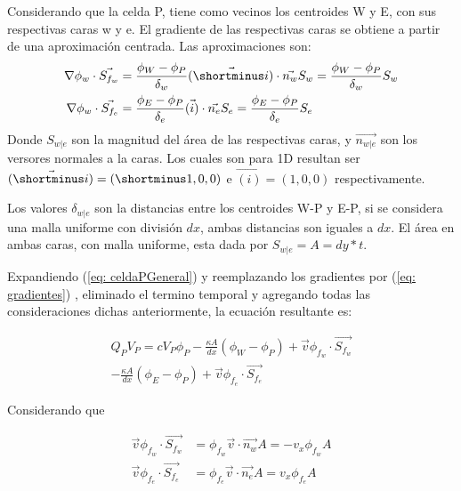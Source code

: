\documentclass{article}
\begin{document}
    Considerando que la celda P, tiene como vecinos los centroides W y E, con sus respectivas caras w y e.
    El gradiente de las respectivas caras se obtiene a partir de una aproximación centrada. Las aproximaciones son:
    \begin{equation}
        \begin{aligned}
            \nabla \phi_w \cdot \vec{S_{f_w}} &=
            \frac{\phi_W - \phi_P}{\delta_w} \vec{(\shortminus i)} \cdot \vec{n_w} S_w =
            \frac{\phi_W - \phi_P}{\delta_w} S_w \\
            \nabla \phi_w \cdot \vec{S_{f_e}} &=
            \frac{\phi_E - \phi_P}{\delta_e} \vec{(i)} \cdot \vec{n_e} S_e =
            \frac{\phi_E - \phi_P}{\delta_e} S_e
        \end{aligned}
        \label{eq: gradientes}
    \end{equation} 
    Donde $S_{w|e}$ son la magnitud del área de las respectivas caras, y $\vec{n_{w|e}}$ son los versores normales a la caras. Los cuales son para 1D resultan ser $\vec{(\shortminus i)} = (\shortminus 1, 0, 0)$ e $\vec{(i)} = (1, 0 , 0)$ respectivamente.
    
    
    Los valores $\delta_{w|e}$ son la distancias entre los centroides W-P y E-P, si se considera una malla uniforme con división $dx$, ambas distancias son iguales a $dx$.
    El área en ambas caras, con malla uniforme, esta dada por $S_{w|e}= A = dy*t$.
    
    Expandiendo (\ref{eq: celdaPGeneral}) y reemplazando los gradientes por (\ref{eq: gradientes}) , eliminado el termino temporal y agregando todas las consideraciones dichas anteriormente, la ecuación resultante es:
    
    \begin{multline}
    	    Q_P V_P = c  V_P \phi_P - \frac{\kappa A}{dx} \left( \phi_W - \phi_P \right) + \vec{v}\phi_{f_w} \cdot \vec{S_{f_w}} \\ 
    	        - \frac{\kappa A}{dx} \left( \phi_E - \phi_P \right) + \vec{v}\phi_{f_e} \cdot \vec{S_{f_e}}  
            \label{eq: celdaPGrad}
    \end{multline}
    
    Considerando que
    
    \begin{equation*}
    	\begin{aligned}
	    	\vec{v}\phi_{f_w} \cdot \vec{S_{f_w}} &=
	    	\phi_{f_w} \vec{v} \cdot \vec{n_w} A =
	    	- v_x \phi_{f_w} A
	    	\\
	    	\vec{v}\phi_{f_e} \cdot \vec{S_{f_e}} &=
	    	\phi_{f_e} \vec{v} \cdot \vec{n_e} A =
	    	v_x \phi_{f_e} A
    	\end{aligned}
    \end{equation*}
    
\end{document}

